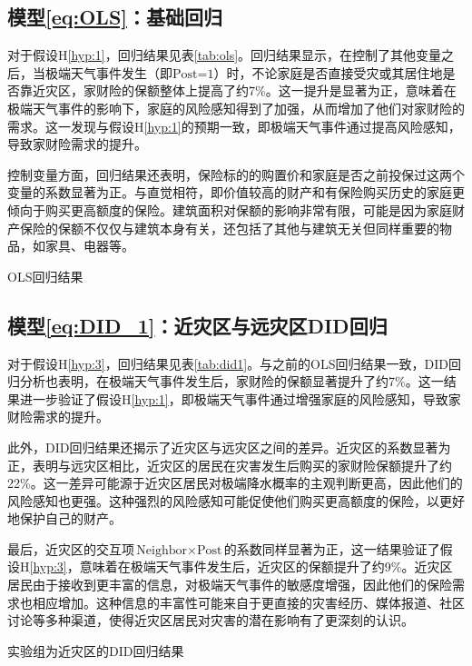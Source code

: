 \subsection{模型\ref{eq:OLS}：基础回归}
对于假设H\ref{hyp:1}，回归结果见表\ref{tab:ols}。回归结果显示，在控制了其他变量之后，当极端天气事件发生（即$\text{Post=1}$）时，不论家庭是否直接受灾或其居住地是否靠近灾区，家财险的保额整体上提高了约7\%。这一提升是显著为正，意味着在极端天气事件的影响下，家庭的风险感知得到了加强，从而增加了他们对家财险的需求。这一发现与假设H\ref{hyp:1}的预期一致，即极端天气事件通过提高风险感知，导致家财险需求的提升。

控制变量方面，回归结果还表明，保险标的的购置价和家庭是否之前投保过这两个变量的系数显著为正。与直觉相符，即价值较高的财产和有保险购买历史的家庭更倾向于购买更高额度的保险。建筑面积对保额的影响非常有限，可能是因为家庭财产保险的保额不仅仅与建筑本身有关，还包括了其他与建筑无关但同样重要的物品，如家具、电器等。

\begin{table}[H]
    \centering
    \caption{OLS回归结果}\label{tab:ols}
    
\end{table}

\subsection{模型\ref{eq:DID_1}：近灾区与远灾区DID回归}
对于假设H\ref{hyp:3}，回归结果见表\ref{tab:did1}。与之前的OLS回归结果一致，DID回归分析也表明，在极端天气事件发生后，家财险的保额显著提升了约7\%。这一结果进一步验证了假设H\ref{hyp:1}，即极端天气事件通过增强家庭的风险感知，导致家财险需求的提升。

此外，DID回归结果还揭示了近灾区与远灾区之间的差异。近灾区的系数显著为正，表明与远灾区相比，近灾区的居民在灾害发生后购买的家财险保额提升了约22\%。这一差异可能源于近灾区居民对极端降水概率的主观判断更高，因此他们的风险感知也更强。这种强烈的风险感知可能促使他们购买更高额度的保险，以更好地保护自己的财产。

最后，近灾区的交互项$\text{Neighbor}\times \text{Post}$的系数同样显著为正，这一结果验证了假设H\ref{hyp:3}，意味着在极端天气事件发生后，近灾区的保额提升了约9\%。近灾区居民由于接收到更丰富的信息，对极端天气事件的敏感度增强，因此他们的保险需求也相应增加。这种信息的丰富性可能来自于更直接的灾害经历、媒体报道、社区讨论等多种渠道，使得近灾区居民对灾害的潜在影响有了更深刻的认识。

\begin{table}[H]
    \centering
    \caption{实验组为近灾区的DID回归结果}\label{tab:did1}
    
\end{table}

